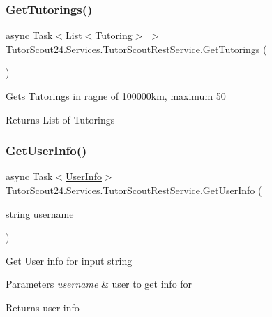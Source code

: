 \subsubsection{\texorpdfstring{Get\+Tutorings()}{GetTutorings()}}
{\footnotesize\ttfamily async Task$<$List$<$\mbox{\hyperlink{class_tutor_scout24_1_1_models_1_1_tutorings_1_1_tutoring}{Tutoring}}$>$ $>$ Tutor\+Scout24.\+Services.\+Tutor\+Scout\+Rest\+Service.\+Get\+Tutorings (\begin{DoxyParamCaption}{ }\end{DoxyParamCaption})\hspace{0.3cm}{\ttfamily [inline]}}



Gets Tutorings in ragne of 100000km, maximum 50 

\begin{DoxyReturn}{Returns}
List of Tutorings
\end{DoxyReturn}
\mbox{\label{class_tutor_scout24_1_1_services_1_1_tutor_scout_rest_service_a0a9cee645967c8be7d723b29778fafae}} 
\subsubsection{\texorpdfstring{Get\+User\+Info()}{GetUserInfo()}}
{\footnotesize\ttfamily async Task$<$\mbox{\hyperlink{class_tutor_scout24_1_1_models_1_1_user_data_1_1_user_info}{User\+Info}}$>$ Tutor\+Scout24.\+Services.\+Tutor\+Scout\+Rest\+Service.\+Get\+User\+Info (\begin{DoxyParamCaption}\item[{string}]{username }\end{DoxyParamCaption})\hspace{0.3cm}{\ttfamily [inline]}}



Get User info for input string 


\begin{DoxyParams}{Parameters}
{\em username} & user to get info for\\
\hline
\end{DoxyParams}
\begin{DoxyReturn}{Returns}
user info
\end{DoxyReturn}
\mbox{\label{class_tutor_scout24_1_1_services_1_1_tutor_scout_rest_service_aaccc0997a181be6e1076fc74b433ab80}} 
